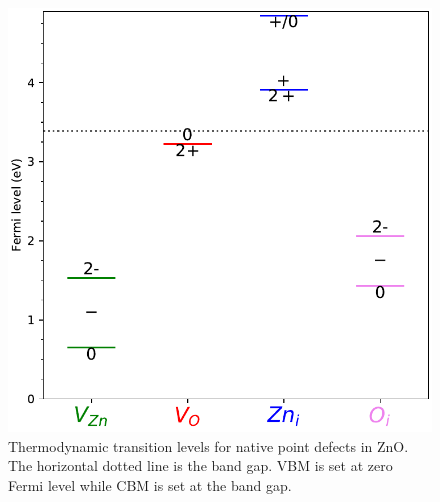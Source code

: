 \begin{figure}[tpbh!]
	\centering
	\includegraphics[width=0.44\linewidth]{"images/rnd/trans_lvl"}
	\caption[Thermodynamic transition levels for native point defects in ZnO]{Thermodynamic transition levels for native point defects in ZnO. The horizontal dotted line is the band gap. VBM is set at zero Fermi level while CBM is set at the band gap.}
	\label{fig:transition_level}
\end{figure}

\clearpage

